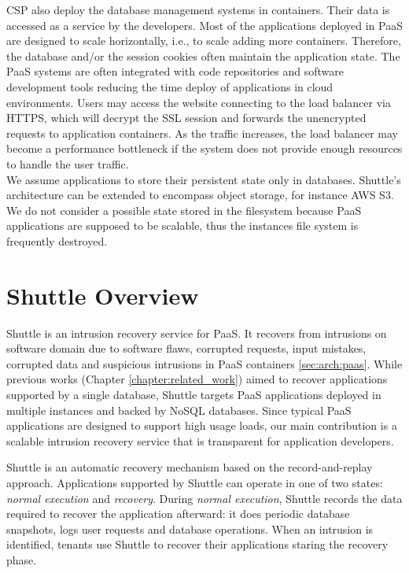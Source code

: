 \acf{CSP} also deploy the database management systems in containers. Their data is accessed as a service by the developers. Most of the applications deployed in \ac{PaaS} are designed to scale horizontally, i.e., to scale adding more containers. Therefore, the database and/or the session cookies often maintain the application state. The \ac{PaaS} systems are often integrated with code repositories and software development tools reducing the time deploy of applications in cloud environments. Users may access the website connecting to the load balancer via \ac{HTTPS}, which will decrypt the \ac{SSL} session and forwards the unencrypted requests to application containers. As the traffic increases, the load balancer may become a performance bottleneck if the system does not provide enough resources to handle the user traffic.\\

We assume applications to store their persistent state only in databases. Shuttle's architecture can be extended to encompass object storage, for instance \acf{AWS} \ac{S3}. We do not consider a possible state stored in the filesystem because \ac{PaaS} applications are supposed to be scalable, thus the instances file system is frequently destroyed.

\FloatBarrier
\section{Shuttle Overview}
\label{sec:arch:overview}
Shuttle is an intrusion recovery service for \ac{PaaS}. It recovers from intrusions on software domain due to software flaws, corrupted requests, input mistakes, corrupted data and suspicious intrusions in \ac{PaaS} containers \ref{sec:arch:paas}. While previous works (Chapter \ref{chapter:related_work}) aimed to recover applications supported by a single database, Shuttle targets \ac{PaaS} applications deployed in multiple instances and backed by \acs{NoSQL} databases. Since typical \ac{PaaS} applications are designed to support high usage loads, our main contribution is a scalable intrusion recovery service that is transparent for application developers. 

Shuttle is an automatic recovery mechanism based on the record-and-replay approach. Applications supported by Shuttle can operate in one of two states: \textit{normal execution} and \textit{recovery}. During \emph{normal execution}, Shuttle records the data required to recover the application afterward: it does periodic database snapshots, logs user requests and database operations. When an intrusion is identified, tenants use Shuttle to recover their applications staring the recovery phase.

